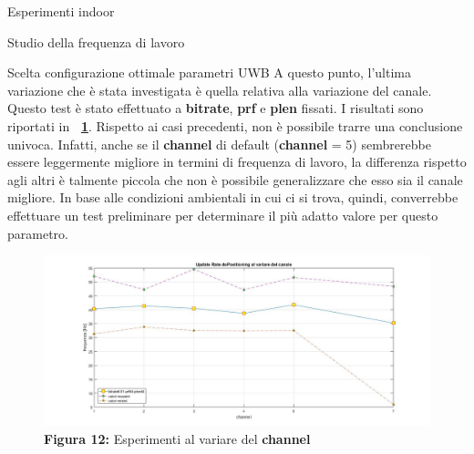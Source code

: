 \documentclass[12pt]{report}
\begin{document}
\begin{section}{Esperimenti indoor}
\begin{subsection}{Studio della frequenza di lavoro}
\begin{subsubsection}{Scelta configurazione ottimale parametri UWB}
			A questo punto, l'ultima variazione che è stata investigata è quella relativa alla variazione del canale. Questo test è stato effettuato a \textbf{bitrate}, \textbf{prf} e \textbf{plen} fissati. I risultati sono riportati in \textbf{\figurename~\ref{FFreqChan}}.
			Rispetto ai casi precedenti, non è possibile trarre una conclusione univoca. Infatti, anche se il \textbf{channel} di default (\textbf{channel} = 5) sembrerebbe essere leggermente migliore in termini di frequenza di lavoro, la differenza rispetto agli altri è talmente piccola che non è possibile generalizzare che esso 				sia il canale migliore. In base alle condizioni ambientali in cui ci si trova, quindi, converrebbe effettuare un test preliminare per determinare il più adatto valore per questo parametro.
			\begin{figure}[H]
				\centering
				\includegraphics[scale=0.3]{FreqChan}
	 			\caption{\textbf{Figura 12:} Esperimenti al variare del \textbf{channel}\label{FFreqChan}}
			\end{figure}
			\begin{table}[H]
						\centering
{}
			\end{table}


\end{subsubsection}
\end{subsection}
\end{section}
\end{document}
